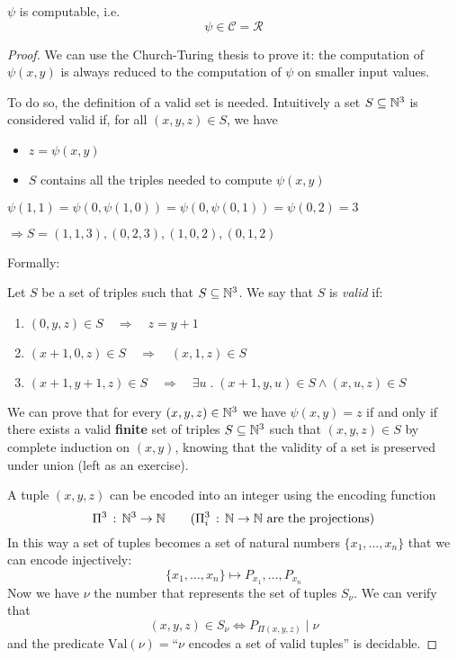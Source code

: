 \begin{theorem}
  $\psi$ is computable, i.e.
  \[\psi \in \mathcal{C} = \mathcal{R}\]
  \begin{proof}
    We can use the Church-Turing thesis to prove it: the computation
    of $\psi(x,y)$ is always reduced to the computation of $\psi$ on
    smaller input values.

    To do so, the definition of a valid set is needed. Intuitively a
    set $S \subseteq \mathbb{N}^3$ is considered valid if, for all $(x,y,z) \in S$, we have
    \begin{itemize}
    \item $z = \psi(x,y)$
    \item $S$ contains all the
      triples needed to compute
      $\psi(x,y)$
    \end{itemize}
    \begin{example}
      $\psi(1,1) = \psi(0,\psi(1,0)) = \psi(0,\psi(0,1)) = \psi(0,2) = 3$

      $\Rightarrow S = {(1,1,3), (0,2,3), (1,0,2), (0,1,2)}$
    \end{example}
    Formally:
    \begin{definition}
      Let $S$ be a set of triples such that $S \subseteq \mathbb{N}^3$. We say
      that $S$ is \emph{valid} if:
      \begin{enumerate}
      \item \((0,y,z) \in S \quad \Rightarrow \quad z = y+1\)
      \item \((x+1,0,z) \in S \quad \Rightarrow \quad (x,1,z) \in S\)
      \item \((x+1,y+1,z) \in S \quad \Rightarrow \quad \exists u \;.\; (x+1,
        y, u) \in S \wedge (x,u,z) \in S \)
      \end{enumerate}
    \end{definition}

    We can prove that for every $(x,y,z)\in\mathbb{N}^3$ we have
   $\psi(x,y) = z$ if and only if there exists a valid \textbf{finite} set of triples $S \subseteq \mathbb{N}^3$ 
    such that \((x,y,z) \in S\) by complete induction on
    $(x,y)$, knowing that the validity of a set is
    preserved under union (left as an exercise).

    \newcommand{\vnu}{\text{Val}(\nu)}

    A tuple $(x,y,z)$ can be encoded into an integer using the
    encoding function
    \[\Pi^3 \, : \, \mathbb{N}^3 \rightarrow \mathbb{N} \quad \quad (\Pi_i^3 \, : \,
      \mathbb{N} \rightarrow \mathbb{N} \text{ are the projections})\] 
    In this way a
    set of tuples becomes a set of natural numbers
    $\{x_1, \dots, x_n\}$ that we can encode injectively:
    \[\{x_1, \dots, x_n\} \mapsto P_{x_1}, \dots, P_{x_n}\] 
    Now we have $\nu$ the number that represents the set of tuples
    $S_\nu$. 
    We can verify that
    \[(x,y,z) \in S_\nu \Longleftrightarrow P_{\Pi(x,y,z)} \; | \;
      \nu \] and the predicate $\vnu=$``$\nu$ encodes a
    set of valid tuples'' is decidable.


\end{proof}
\end{theorem}
